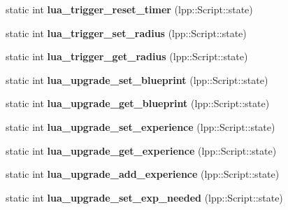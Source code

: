 \begin{DoxyCompactItemize}
\item 
static int {\bfseries lua\+\_\+trigger\+\_\+reset\+\_\+timer} (lpp\+::\+Script\+::state)\hypertarget{class_lua_interface_a3dfed826e2f6b23e88ec09a72229eac2}{}\label{class_lua_interface_a3dfed826e2f6b23e88ec09a72229eac2}

\item 
static int {\bfseries lua\+\_\+trigger\+\_\+set\+\_\+radius} (lpp\+::\+Script\+::state)\hypertarget{class_lua_interface_ad97ff458c1631d5259d9261acc0fe9ba}{}\label{class_lua_interface_ad97ff458c1631d5259d9261acc0fe9ba}

\item 
static int {\bfseries lua\+\_\+trigger\+\_\+get\+\_\+radius} (lpp\+::\+Script\+::state)\hypertarget{class_lua_interface_ae1b1aa393f1c843fbf221a19831644ca}{}\label{class_lua_interface_ae1b1aa393f1c843fbf221a19831644ca}

\item 
static int {\bfseries lua\+\_\+upgrade\+\_\+set\+\_\+blueprint} (lpp\+::\+Script\+::state)\hypertarget{class_lua_interface_aebfe0a9e97077b997e2d7f7645474518}{}\label{class_lua_interface_aebfe0a9e97077b997e2d7f7645474518}

\item 
static int {\bfseries lua\+\_\+upgrade\+\_\+get\+\_\+blueprint} (lpp\+::\+Script\+::state)\hypertarget{class_lua_interface_a21ce49765b04313f6883a7de0207b6c3}{}\label{class_lua_interface_a21ce49765b04313f6883a7de0207b6c3}

\item 
static int {\bfseries lua\+\_\+upgrade\+\_\+set\+\_\+experience} (lpp\+::\+Script\+::state)\hypertarget{class_lua_interface_adb3aba47fbd9119ee0a02dea9b5be8ee}{}\label{class_lua_interface_adb3aba47fbd9119ee0a02dea9b5be8ee}

\item 
static int {\bfseries lua\+\_\+upgrade\+\_\+get\+\_\+experience} (lpp\+::\+Script\+::state)\hypertarget{class_lua_interface_abc90ffb1920626c9d92d9906dd826328}{}\label{class_lua_interface_abc90ffb1920626c9d92d9906dd826328}

\item 
static int {\bfseries lua\+\_\+upgrade\+\_\+add\+\_\+experience} (lpp\+::\+Script\+::state)\hypertarget{class_lua_interface_aa64612d8542c196f18e7b29b437e56d1}{}\label{class_lua_interface_aa64612d8542c196f18e7b29b437e56d1}

\item 
static int {\bfseries lua\+\_\+upgrade\+\_\+set\+\_\+exp\+\_\+needed} (lpp\+::\+Script\+::state)\hypertarget{class_lua_interface_a1b6be0c0a8b739e909b937302674ad76}{}\label{class_lua_interface_a1b6be0c0a8b739e909b937302674ad76}


\end{DoxyCompactItemize}
